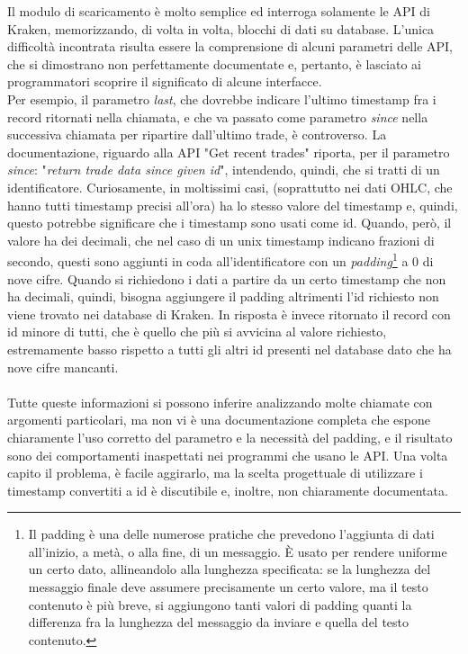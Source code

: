 \documentclass[a4paper,12pt]{report}
\begin{document}
Il modulo di scaricamento è molto semplice ed interroga solamente le API di Kraken, memorizzando, di volta in volta, blocchi di dati su database. L'unica difficoltà incontrata risulta essere la comprensione di alcuni parametri delle API, che si dimostrano non perfettamente documentate e, pertanto, è lasciato ai programmatori scoprire il significato di alcune interfacce.\\ %
Per esempio, il parametro \textit{last}, che dovrebbe indicare l'ultimo timestamp fra i record ritornati nella chiamata, e che va passato come parametro \textit{since} nella successiva chiamata per ripartire dall'ultimo trade, è controverso. La documentazione, riguardo alla API "Get recent trades" riporta, per il parametro \textit{since}: "\textit{return trade data since given id}", intendendo, quindi, che si tratti di un identificatore. Curiosamente, in moltissimi casi, (soprattutto nei dati OHLC, che hanno tutti timestamp precisi all'ora) ha lo stesso valore del timestamp e, quindi, questo potrebbe significare che i timestamp sono usati come id. Quando, però, il valore ha dei decimali, che nel caso di un unix timestamp indicano frazioni di secondo, questi sono aggiunti in coda all'identificatore con un \textit{padding}\footnote{Il padding è una delle numerose pratiche che prevedono l'aggiunta di dati all'inizio, a metà, o alla fine, di un messaggio. È usato per rendere uniforme un certo dato, allineandolo alla lunghezza specificata: se la lunghezza del messaggio finale deve assumere precisamente un certo valore, ma il testo contenuto è più breve, si aggiungono tanti valori di padding quanti la differenza fra la lunghezza del messaggio da inviare e quella del testo contenuto.} a 0 di nove cifre. Quando si richiedono i dati a partire da un certo timestamp che non ha decimali, quindi, bisogna aggiungere il padding altrimenti l'id richiesto non viene trovato nei database di Kraken. In risposta è invece ritornato il record con id minore di tutti, che è quello che più si avvicina al valore richiesto, estremamente basso rispetto a tutti gli altri id presenti nel database dato che ha nove cifre mancanti.\\~\\
Tutte queste informazioni si possono inferire analizzando molte chiamate con argomenti particolari, ma non vi è una documentazione completa che espone chiaramente l'uso corretto del parametro e la necessità del padding, e il risultato sono dei comportamenti inaspettati nei programmi che usano le API. Una volta capito il problema, è facile aggirarlo, ma la scelta progettuale di utilizzare i timestamp convertiti a id è discutibile e, inoltre, non chiaramente documentata.
\end{document}
